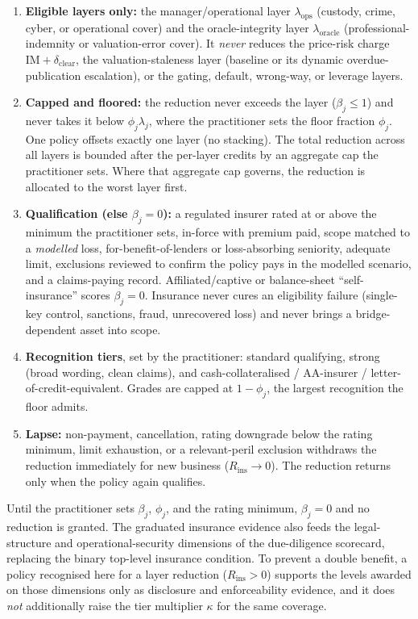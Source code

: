 \begin{enumerate}[label=(\roman*),itemsep=1pt]
\item \textbf{Eligible layers only:} the manager/operational layer $\lambda_{\mathrm{ops}}$ (custody, crime, cyber, or operational cover) and the oracle-integrity layer $\lambda_{\mathrm{oracle}}$ (professional-indemnity or valuation-error cover). It \emph{never} reduces the price-risk charge $\mathrm{IM}+\delta_{\mathrm{clear}}$, the valuation-staleness layer (baseline or its dynamic overdue-publication escalation), or the gating, default, wrong-way, or leverage layers.
\item \textbf{Capped and floored:} the reduction never exceeds the layer ($\beta_j\le 1$) and never takes it below $\phi_j\lambda_j$, where the practitioner sets the floor fraction $\phi_j$. One policy offsets exactly one layer (no stacking). The total reduction across all layers is bounded after the per-layer credits by an aggregate cap the practitioner sets. Where that aggregate cap governs, the reduction is allocated to the worst layer first.
\item \textbf{Qualification (else $\beta_j=0$):} a regulated insurer rated at or above the minimum the practitioner sets, in-force with premium paid, scope matched to a \emph{modelled} loss, for-benefit-of-lenders or loss-absorbing seniority, adequate limit, exclusions reviewed to confirm the policy pays in the modelled scenario, and a claims-paying record. Affiliated/captive or balance-sheet ``self-insurance'' scores $\beta_j=0$. Insurance never cures an eligibility failure (single-key control, sanctions, fraud, unrecovered loss) and never brings a bridge-dependent asset into scope.
\item \textbf{Recognition tiers}, set by the practitioner: standard qualifying, strong (broad wording, clean claims), and cash-collateralised / AA-insurer / letter-of-credit-equivalent. Grades are capped at $1-\phi_j$, the largest recognition the floor admits.
\item \textbf{Lapse:} non-payment, cancellation, rating downgrade below the rating minimum, limit exhaustion, or a relevant-peril exclusion withdraws the reduction immediately for new business ($R_{\mathrm{ins}}\to0$). The reduction returns only when the policy again qualifies.
\end{enumerate}
Until the practitioner sets $\beta_j$, $\phi_j$, and the rating minimum, $\beta_j=0$ and no reduction is granted. The graduated insurance evidence also feeds the legal-structure and operational-security dimensions of the due-diligence scorecard, replacing the binary top-level insurance condition. To prevent a double benefit, a policy recognised here for a layer reduction ($R_{\mathrm{ins}}>0$) supports the levels awarded on those dimensions only as disclosure and enforceability evidence, and it does \emph{not} additionally raise the tier multiplier $\kappa$ for the same coverage.

